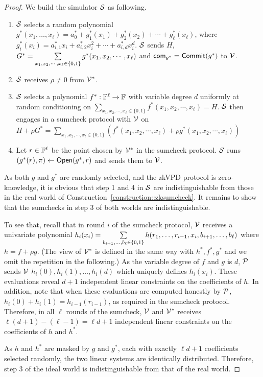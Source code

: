 \begin{proof}
	
	We build the simulator $\S$ as following.
	
	\begin{enumerate}
		
		\item $\S$ selects a random polynomial $g^*(x_1,\ldots,x_\ell) = a^*_{0} + g^*_1(x_1) + g^*_2(x_2) + \cdots + g^*_\ell(x_\ell)$, where $g^*_i(x_i) = a^*_{i,1}x_i + a^*_{i,2}x_i^2 + \cdots + a^*_{i,d}x_i^d$. $\S$ sends $H$, $G^* = \sum\limits_{x_1, x_2, \cdots, x_\ell \in \binary} g^*(x_1, x_2, \cdots, x_\ell)$ and $\comm_{g^*} = \Commit(g^*)$ to $\V$.
		
			
		\item $\S$ receives $\rho \neq 0$ from $\V^*$.
		\item $\S$ selects a polynomial $f^*:\F^\ell\rightarrow\F$ with variable degree $d$ uniformly at random conditioning on $\sum\limits_{x_1, x_2, \cdots, x_\ell \in \{0, 1\}}f^*(x_1, x_2, \cdots, x_\ell) = H$. $\S$ then engages in a sumcheck protocol with $\V$ on  $H+\rho G^* = \sum\limits_{x_1, x_2, \cdots, x_l \in \{0, 1\}}(f^*(x_1, x_2, \cdots, x_\ell)+\rho g^*(x_1, x_2, \cdots, x_\ell))$
		
		\item Let $r \in \F^\ell$ be the point chosen by $\V^*$ in the sumcheck protocol. $\S$ runs $(g^*(r), \pi)\leftarrow\Open(g^*,r)$ and sends them to $\V$.
		
	\end{enumerate} 
	
	As both $g$ and $g^*$ are randomly selected, and the zkVPD protocol is zero-knowledge, it is obvious that step 1 and 4 in $\S$ are indistinguishable from those in the real world of Construction~\ref{construction::zksumcheck}. It remains to show that the sumchecks in step 3 of both worlds are indistinguishable.
	
	To see that, recall that in round $i$ of the sumcheck protocol, $\V$ receives a univariate polynomial $h_i(x_i) = \sum\limits_{b_{i+1}, \ldots,b_\ell\in\binary}h(r_1, \ldots, r_{i-1},x_i, b_{i+1}, \ldots, b_\ell)$ where $h = f+\rho g$. (The view of $\V^*$ is defined in the same way with $h^*,f^*,g^*$ and we omit the repetition in the following.) As the variable degree of $f$ and $g$ is $d$, $\P$ sends $\V$ $h_i(0), h_i(1), \ldots, h_i(d)$ which uniquely defines $h_i(x_i)$. These evaluations reveal $d+1$ independent linear constraints on the coefficients of $h$. In addition, note that when these evaluations are computed honestly by $\P$, $h_i(0)+h_i(1) = h_{i-1}(r_{i-1})$, as required in the sumcheck protocol. Therefore, in all $\ell$ rounds of the sumcheck, $\V$ and $\V^*$ receives $\ell(d+1) - (\ell-1) = \ell d+1$ independent linear constraints on the coefficients of $h$ and $h^*$. 
	
	As $h$ and $h^*$ are masked by $g$ and $g^*$, each with exactly $\ell d+1$ coefficients selected randomly, the two linear systems are identically distributed. Therefore, step 3 of the ideal world is indistinguishable from that of the real world.
	
\end{proof}



